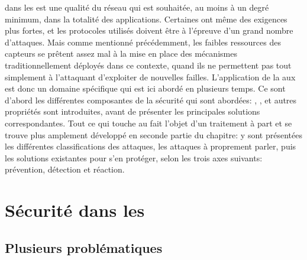 \vfil
{} dans les \rcsfs est une qualité du réseau qui est souhaitée, au moins à un degré minimum, dans la totalité des applications.
Certaines ont même des exigences plus fortes, et les protocoles utilisés doivent être à l'épreuve d'un grand nombre d'attaques.
Mais comme mentionné précédemment, les faibles ressources des capteurs se prêtent assez mal à la mise en place des mécanismes traditionnellement déployés dans ce contexte, quand ils ne permettent pas tout simplement à l'attaquant d'exploiter de nouvelles failles.
L'application de la \secu aux \rcs est donc un domaine spécifique qui est ici abordé en plusieurs temps.
Ce sont d'abord les différentes composantes de la sécurité qui sont abordées: , ,  et autres propriétés sont introduites, avant de présenter les principales solutions correspondantes.
Tout ce qui touche au \dds fait l'objet d'un traitement à part et se trouve plus amplement développé en seconde partie du chapitre: y sont présentées les différentes classifications des attaques, les attaques à proprement parler, puis les solutions existantes pour s'en protéger, selon les trois axes suivants: prévention, détection et réaction.
\vfil

\section{Sécurité dans les \rcs}\label{ea:sec:secu}

\subsection{Plusieurs problématiques}

